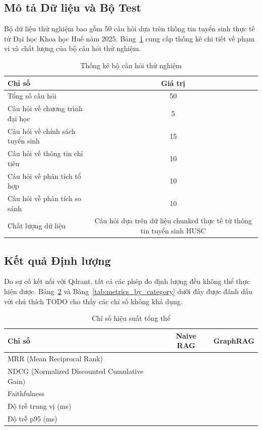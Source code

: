 \subsection{Mô tả Dữ liệu và Bộ Test}
Bộ dữ liệu thử nghiệm bao gồm 50 câu hỏi dựa trên thông tin tuyển sinh thực tế từ Đại học Khoa học Huế năm 2025. Bảng~\ref{tab:test_questions_stats} cung cấp thống kê chi tiết về phạm vi và chất lượng của bộ câu hỏi thử nghiệm.

\begin{table}[htbp]
\centering
\caption{Thống kê bộ câu hỏi thử nghiệm}
\label{tab:test_questions_stats}
\begin{tabular}{lc}
\toprule
Chỉ số & Giá trị \\
\midrule
Tổng số câu hỏi & 50 \\
Câu hỏi về chương trình đại học & 5 \\
Câu hỏi về chính sách tuyển sinh & 15 \\
Câu hỏi về thông tin chỉ tiêu & 10 \\
Câu hỏi về phân tích tổ hợp & 10 \\
Câu hỏi về phân tích so sánh & 10 \\
Chất lượng dữ liệu & Câu hỏi dựa trên dữ liệu chunked thực tế từ thông tin tuyển sinh HUSC \\
\bottomrule
\end{tabular}
\end{table}

\subsection{Kết quả Định lượng}
Do sự cố kết nối với Qdrant, tất cả các phép đo định lượng đều không thể thực hiện được. Bảng~\ref{tab:overall_metrics} và Bảng~\ref{tab:metrics_by_category} dưới đây được đánh dấu với chú thích TODO cho thấy các chỉ số không khả dụng.

\begin{table}[htbp]
\centering
\caption{Chỉ số hiệu suất tổng thể}
\label{tab:overall_metrics}
\begin{tabular}{lcc}
\toprule
Chỉ số & Naive RAG & GraphRAG \\
\midrule
MRR (Mean Reciprocal Rank) & %
 & %
 \\
NDCG (Normalized Discounted Cumulative Gain) & %
 & %
 \\
Faithfulness & %
 & %
 \\
Độ trễ trung vị (ms) & %
 & %
 \\
Độ trễ p95 (ms) & %
 & %
 \\
\bottomrule
\end{tabular}
\end{table}

